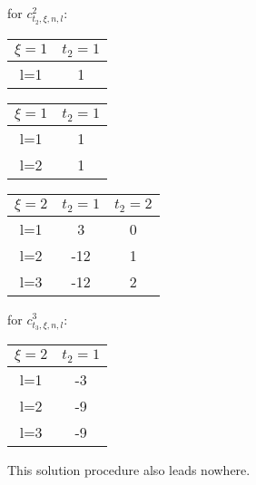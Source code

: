 for \(c^2_{t_2, \xi, n, l}\):

\begin{table}[h!]
	     \centering
	     \begin{tabular}{||c| c ||} 
	     	     \hline
	     	     \hline
	     	     \(\xi = 1\) & \(t_2=1\) \\ [0.5ex] 
	     	     \hline
	     	     l=1 & 1 \\[1ex] 
	     	     \hline
	     	     \hline
	     \end{tabular}
\end{table}

\begin{table}[h!]
	     \centering
	     \begin{tabular}{||c| c ||} 
	     	     \hline
	     	     \hline
	     	     \(\xi = 1\) & \(t_2=1\) \\ [0.5ex] 
	     	     \hline
	     	     l=1 & 1 \\
	     	     l=2 & 1 \\[1ex] 
	     	     \hline
	     	     \hline
	     \end{tabular}
\end{table}

\begin{table}[h!]
	     \centering
	     \begin{tabular}{||c| c c ||} 
	     	     \hline
	     	     \hline
	     	     \(\xi = 2\) & \(t_2=1\) & \(t_2=2\) \\ [0.5ex] 
	     	     \hline
	     	     l=1 & 3 & 0 \\ 
	     	     l=2 & -12 & 1\\
	     	     l=3 & -12 & 2\\[1ex] 
	     	     \hline
	     	     \hline
	     \end{tabular}
\end{table}

for \(c^3_{t_3, \xi, n, l}\):

\begin{table}[h!]
	     \centering
	     \begin{tabular}{||c| c  ||} 
	     	     \hline
	     	     \hline
	     	     \(\xi = 2\) & \(t_2=1\) \\ [0.5ex] 
	     	     \hline
	     	     l=1 & -3  \\ 
	     	     l=2 & -9 \\
	     	     l=3 & -9 \\[1ex] 
	     	     \hline
	     	     \hline
	     \end{tabular}
\end{table}

This solution procedure also leads nowhere.
